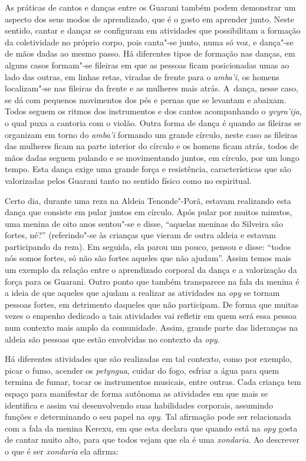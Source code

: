 As práticas de cantos e danças entre os Guarani também podem demonstrar
um aspecto dos seus modos de aprendizado, que é o gosto em aprender
junto. Neste sentido, cantar e dançar se configuram em atividades que
possibilitam a formação da coletividade no próprio corpo, pois canta"-se
junto, numa só voz, e dança"-se de mãos dadas ao mesmo passo. Há
diferentes tipos de formação nas danças, em alguns casos formam"-se
fileiras em que as pessoas ficam posicionadas umas ao lado das outras,
em linhas retas, viradas de frente para o \emph{amba’i}, os homens
localizam"-se nas fileiras da frente e as mulheres mais atrás. A~dança,
nesse caso, se dá com pequenos movimentos dos pés e pernas que se
levantam e abaixam. Todos seguem os ritmos dos instrumentos e dos
cantos acompanhando o \emph{yvyra’ija}, o qual puxa a cantoria com o violão.
Outra forma de dança é quando as fileiras se organizam em torno do
\emph{amba’i} formando um grande círculo, neste caso as fileiras das mulheres
ficam na parte interior do círculo e os homens ficam atrás, todos de
mãos dadas seguem pulando e se movimentando juntos, em círculo, por um
longo tempo. Esta dança exige uma grande força e resistência,
características que são valorizadas pelos Guarani tanto no sentido
físico como no espiritual.

Certo dia, durante uma reza na Aldeia Tenonde"-Porã, estavam realizando
esta dança que consiste em pular juntos em círculo. Após pular por
muitos minutos, uma menina de oito anos sentou"-se e disse, ``aquelas
meninas do Silveira são fortes, né?'' (referindo"-se às crianças que
vieram de outra aldeia e estavam participando da reza). Em seguida, ela
parou um pouco, pensou e disse: ``todos nós somos fortes, só não são
fortes aqueles que não ajudam''. Assim temos mais um exemplo da relação
entre o aprendizado corporal da dança e a valorização da força para os
Guarani. Outro ponto que também transparece na fala da menina é a ideia
de que aqueles que ajudam a realizar as atividades na \emph{opy} se tornam
pessoas fortes, em detrimento daqueles que não participam. De forma que
muitas vezes o empenho dedicado a tais atividades vai refletir em quem
será essa pessoa num contexto mais amplo da comunidade. Assim, grande
parte das lideranças na aldeia são pessoas que estão envolvidas no
contexto da \emph{opy}.

Há diferentes atividades que são realizadas em tal contexto, como por
exemplo, picar o fumo, acender os \emph{petyngua}, cuidar do fogo, esfriar a
água para quem termina de fumar, tocar os instrumentos musicais, entre
outras. Cada criança tem espaço para manifestar de forma autônoma as
atividades em que mais se identifica e assim vai desenvolvendo suas
habilidades corporais, assumindo funções e determinando o seu papel na
\emph{opy}. Tal afirmação pode ser relacionada com a fala da menina Kerexu, em
que esta declara que quando está na \emph{opy} gosta de cantar muito alto,
para que todos vejam que ela é uma \emph{xondaria}. Ao descrever o que é ser
\emph{xondaria} ela afirma:

